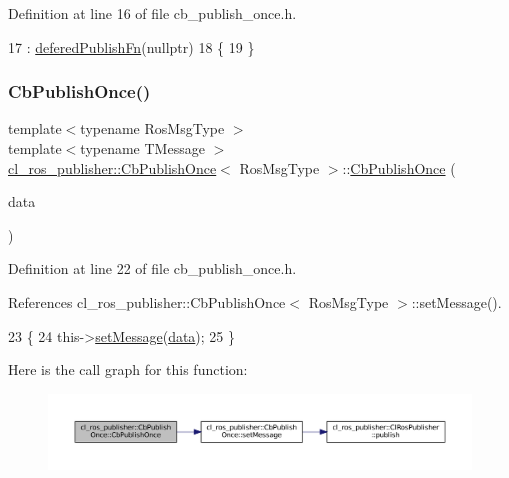Definition at line 16 of file cb\+\_\+publish\+\_\+once.\+h.


\begin{DoxyCode}
17         : \hyperlink{classcl__ros__publisher_1_1CbPublishOnce_a6222a91fb87cd3118ca9f84ff857c696}{deferedPublishFn}(\textcolor{keyword}{nullptr})
18     \{
19     \}
\end{DoxyCode}
\mbox{\label{classcl__ros__publisher_1_1CbPublishOnce_a54d9062c233e9949ec45c27da69cf83d}} 
\subsubsection{\texorpdfstring{Cb\+Publish\+Once()}{CbPublishOnce()}\hspace{0.1cm}{\footnotesize\ttfamily [2/2]}}
{\footnotesize\ttfamily template$<$typename Ros\+Msg\+Type $>$ \\
template$<$typename T\+Message $>$ \\
\hyperlink{classcl__ros__publisher_1_1CbPublishOnce}{cl\+\_\+ros\+\_\+publisher\+::\+Cb\+Publish\+Once}$<$ Ros\+Msg\+Type $>$\+::\hyperlink{classcl__ros__publisher_1_1CbPublishOnce}{Cb\+Publish\+Once} (\begin{DoxyParamCaption}\item[{const T\+Message \&}]{data }\end{DoxyParamCaption})\hspace{0.3cm}{\ttfamily [inline]}}



Definition at line 22 of file cb\+\_\+publish\+\_\+once.\+h.



References cl\+\_\+ros\+\_\+publisher\+::\+Cb\+Publish\+Once$<$ Ros\+Msg\+Type $>$\+::set\+Message().


\begin{DoxyCode}
23     \{
24         this->\hyperlink{classcl__ros__publisher_1_1CbPublishOnce_aedf3cb7940951d76773f46c807f34a58}{setMessage}(\hyperlink{namespacekeyboard__server__node_abfec01745fb17e2aa813913bea03d707}{data});
25     \}
\end{DoxyCode}
Here is the call graph for this function\+:
\nopagebreak
\begin{figure}[H]
\begin{center}
\leavevmode
\includegraphics[width=350pt]{classcl__ros__publisher_1_1CbPublishOnce_a54d9062c233e9949ec45c27da69cf83d_cgraph}
\end{center}
\end{figure}


